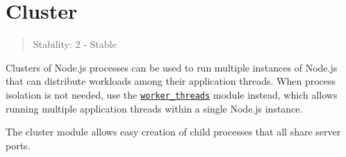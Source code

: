 \section{Cluster}\label{cluster}

\begin{quote}
Stability: 2 - Stable
\end{quote}

Clusters of Node.js processes can be used to run multiple instances of
Node.js that can distribute workloads among their application threads.
When process isolation is not needed, use the
\href{worker_threads.md}{\texttt{worker\_threads}} module instead, which
allows running multiple application threads within a single Node.js
instance.

The cluster module allows easy creation of child processes that all
share server ports.

